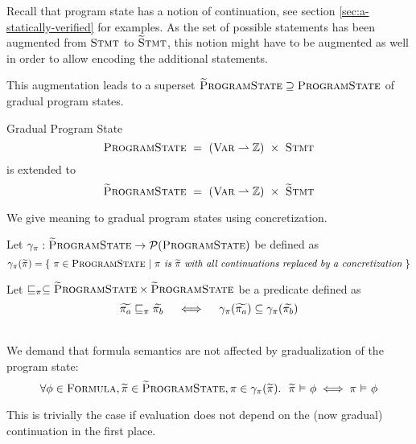 Recall that program state has a notion of continuation, see section \ref{sec:a-statically-verified} for examples.
As the set of possible statements has been augmented from $\textup{\textsc{Stmt}}$ to $\textup{\textsc{\ensuremath{\widetilde{\text{S}}}tmt}}$, this notion might have to be augmented as well in order to allow encoding the additional statements.

This augmentation leads to a superset $\textup{\textsc{\ensuremath{\widetilde{\text{P}}}rogramState}} \supseteq \textup{\textsc{ProgramState}}$ of gradual program states.
\begin{example}{Gradual Program State}
\label{ex:grad-ps}
$$\textup{\textsc{ProgramState}} ~  =~ (\textup{\textsc{Var}} \rightharpoonup \mathbb{Z}) ~\times~ \textup{\textsc{Stmt}}$$
is extended to
$$\textup{\textsc{\ensuremath{\widetilde{\text{P}}}rogramState}} ~ =~ (\textup{\textsc{Var}} \rightharpoonup \mathbb{Z}) ~\times~ \textup{\textsc{\ensuremath{\widetilde{\text{S}}}tmt}}$$
\end{example}

We give meaning to gradual program states using concretization.
\begin{definition}
    Let $\gamma_{\pi} : \textup{\textsc{\ensuremath{\widetilde{\text{P}}}rogramState}} \rightarrow \mathcal{P}(\textup{\textsc{ProgramState}})$ be defined as
    \begin{displaymath}
    \gamma_{\pi}(\widetilde{\pi}) = \{~ \pi \in \textup{\textsc{ProgramState}} ~|~ \textit{$\pi$ is $\widetilde{\pi}$ with all continuations replaced by a concretization} ~\}
    \end{displaymath} 
\end{definition}
\begin{definition}
    Let $\sqsubseteq_{\pi} \subseteq \textup{\textsc{\ensuremath{\widetilde{\text{P}}}rogramState}} \times \textup{\textsc{\ensuremath{\widetilde{\text{P}}}rogramState}}$ be a predicate defined as
    $$\widetilde{\pi_a} \sqsubseteq_{\pi} \widetilde{\pi_b}  \quad\iff\quad  \gamma_{\pi}(\widetilde{\pi_a}) \subseteq \gamma_{\pi}(\widetilde{\pi_b})$$
\end{definition}

\begin{comment}
Consequence:
\begin{displaymath}
\forall \grad{\pi_{\grad{s}}} \in \setGProgramState_{\grad{s}}, \pi \in \gamma_{\pi}(\grad{\pi_{\grad{s}}}).~ \exists s \in \gamma_s(\grad{s}).~ \pi \in \setProgramState_s
\end{displaymath}
\end{comment}

\begin{lemma}
    \label{lemma:gradPS-form-sem}~\\
    We demand that formula semantics are not affected by gradualization of the program state:
    \begin{displaymath}
    \forall \phi \in \textup{\textsc{Formula}}, \widetilde{\pi} \in \textup{\textsc{\ensuremath{\widetilde{\text{P}}}rogramState}}, \pi \in \gamma_{\pi}(\widetilde{\pi}).~~ \widetilde{\pi} \,\,{\vDash}\,\, \phi \iff \pi \,\,{\vDash}\,\, \phi
    \end{displaymath}
    
    This is trivially the case if evaluation does not depend on the (now gradual) continuation in the first place.
\end{lemma}

